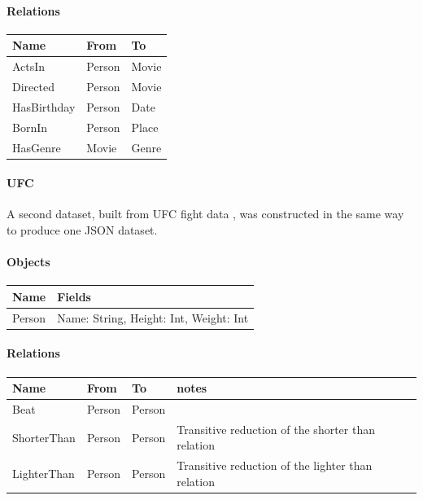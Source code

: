 \documentclass[12pt,a4paper,twoside,openright]{report}
\begin{document}
\paragraph{Relations}
\begin{center}
	\begin{tabular}{ |p{3cm}|| p{3cm}| p{3cm}|}
	\hline
		Name &  From & To \\ \hline
		ActsIn & Person & Movie \\ \hline
		Directed & Person & Movie\\ \hline
		HasBirthday &Person & Date\\ \hline
		BornIn & Person & Place\\ \hline
		HasGenre & Movie & Genre\\ \hline
	\end{tabular}
\end{center}

		\paragraph{UFC}
		
		A second dataset, built from UFC fight data \cite{UFC}, was constructed in the same way to produce one JSON dataset.
		
		\paragraph{Objects}
\begin{center}
	\begin{tabular}{ |p{3cm}| p{9cm}|}
	\hline
		Name & Fields \\ \hline
		Person & Name: String, Height: Int, Weight: Int\\ \hline
	\end{tabular}
\end{center}

\paragraph{Relations}
\begin{center}
	\begin{tabular}{ |p{3cm}|| p{2cm}| p{2cm}||p{3cm}|}
	\hline
		Name &  From & To & notes \\ \hline
		Beat & Person & Person & \\ \hline
		ShorterThan &  Person & Person & Transitive reduction of the shorter than relation \\ \hline
		LighterThan & Person & Person & Transitive reduction of the lighter than relation \\ \hline

	\end{tabular}
\end{center}
		
\end{document}
